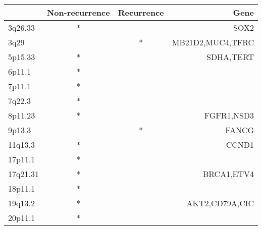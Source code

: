 \begin{tabular}{lccr}
\toprule
{} & Non-recurrence & Recurrence &              Gene \\
\midrule
3q26.33  &              * &            &              SOX2 \\
3q29     &                &          * &  MB21D2,MUC4,TFRC \\
5p15.33  &              * &            &         SDHA,TERT \\
6p11.1   &              * &            &                   \\
7p11.1   &              * &            &                   \\
7q22.3   &              * &            &                   \\
8p11.23  &              * &            &        FGFR1,NSD3 \\
9p13.3   &                &          * &             FANCG \\
11q13.3  &              * &            &             CCND1 \\
17p11.1  &              * &            &                   \\
17q21.31 &              * &            &        BRCA1,ETV4 \\
18p11.1  &              * &            &                   \\
19q13.2  &              * &            &    AKT2,CD79A,CIC \\
20p11.1  &              * &            &                   \\
\bottomrule
\end{tabular}
